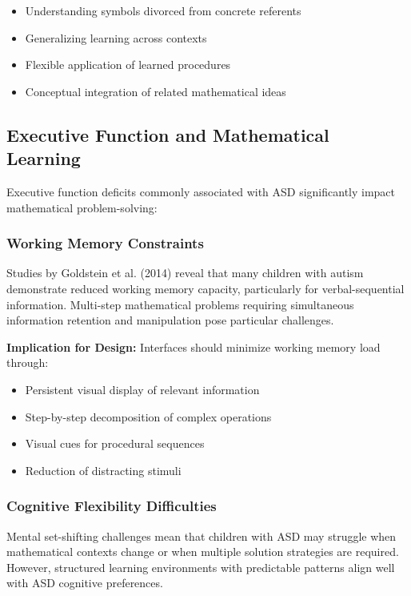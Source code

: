 \documentclass[12pt, a4paper]{article}
\begin{document}
\begin{itemize}[leftmargin=*]
    \item Understanding symbols divorced from concrete referents
    \item Generalizing learning across contexts
    \item Flexible application of learned procedures
    \item Conceptual integration of related mathematical ideas
\end{itemize}

\subsection{Executive Function and Mathematical Learning}

Executive function deficits commonly associated with ASD significantly impact mathematical problem-solving:

\subsubsection{Working Memory Constraints}

Studies by Goldstein et al. (2014) reveal that many children with autism demonstrate reduced working memory capacity, particularly for verbal-sequential information. Multi-step mathematical problems requiring simultaneous information retention and manipulation pose particular challenges.

\textbf{Implication for Design:} Interfaces should minimize working memory load through:
\begin{itemize}[leftmargin=*]
    \item Persistent visual display of relevant information
    \item Step-by-step decomposition of complex operations
    \item Visual cues for procedural sequences
    \item Reduction of distracting stimuli
\end{itemize}

\subsubsection{Cognitive Flexibility Difficulties}

Mental set-shifting challenges mean that children with ASD may struggle when mathematical contexts change or when multiple solution strategies are required. However, structured learning environments with predictable patterns align well with ASD cognitive preferences.
\end{document}
